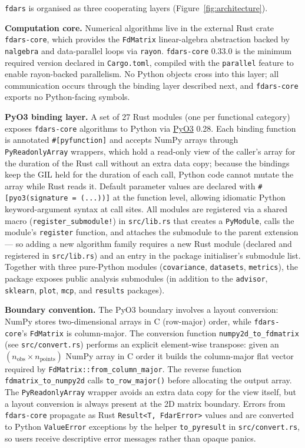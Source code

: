 \texttt{fdars} is organised as three cooperating layers
(Figure~\ref{fig:architecture}).

\textbf{Computation core.}  Numerical algorithms live in the external Rust
crate \texttt{fdars-core}, which provides the \texttt{FdMatrix} linear-algebra
abstraction backed by \texttt{nalgebra} and data-parallel loops via
\texttt{rayon}.  \texttt{fdars-core} 0.33.0 is the minimum required version
declared in \texttt{Cargo.toml}, compiled with the \texttt{parallel} feature
to enable rayon-backed parallelism.  No Python objects cross into this layer;
all communication occurs through the binding layer described next, and
\texttt{fdars-core} exports no Python-facing symbols.

\textbf{PyO3 binding layer.}  A set of 27 Rust modules (one per
functional category) exposes \texttt{fdars-core} algorithms to Python via
\href{https://pyo3.rs}{PyO3} 0.28.  Each binding function is annotated
\texttt{\#[pyfunction]} and accepts NumPy arrays through
\texttt{PyReadonlyArray} wrappers, which hold a read-only view of the
caller's array for the duration of the Rust call without an extra data copy;
because the bindings keep the GIL held for the duration of each call, Python
code cannot mutate the array while Rust reads it.
Default parameter values are declared with \texttt{\#[pyo3(signature = (...))]}
at the function level, allowing idiomatic Python keyword-argument syntax at
call sites.  All modules are registered via a shared macro
(\texttt{register\_submodule!}) in \texttt{src/lib.rs} that creates a
\texttt{PyModule}, calls the module's \texttt{register} function, and attaches
the submodule to the parent extension --- so adding a new algorithm family
requires a new Rust module (declared and registered in \texttt{src/lib.rs})
and an entry in the package initialiser's submodule list.  Together with three
pure-Python modules (\texttt{covariance}, \texttt{datasets},
\texttt{metrics}), the package exposes \nsubmodules{} public analysis
submodules (in addition to the \texttt{advisor}, \texttt{sklearn},
\texttt{plot}, \texttt{mcp}, and \texttt{results} packages).

\textbf{Boundary convention.}  The PyO3 boundary involves a layout conversion:
NumPy stores two-dimensional arrays in C (row-major) order, while
\texttt{fdars-core}'s \texttt{FdMatrix} is column-major.  The conversion
function \texttt{numpy2d\_to\_fdmatrix} (see \texttt{src/convert.rs}) performs
an explicit element-wise transpose: given an $(n_\mathrm{obs} \times
n_\mathrm{points})$ NumPy array in C order it builds the column-major flat
vector required by \texttt{FdMatrix::from\_column\_major}.  The reverse
function \texttt{fdmatrix\_to\_numpy2d} calls \texttt{to\_row\_major()} before
allocating the output array.  The \texttt{PyReadonlyArray} wrapper avoids an
extra data copy for the view itself, but a layout conversion is always present
at the 2D matrix boundary.  Errors from \texttt{fdars-core} propagate as Rust
\texttt{Result<T, FdarError>} values and are converted to Python
\texttt{ValueError} exceptions by the helper \texttt{to\_pyresult} in
\texttt{src/convert.rs}, so users receive descriptive error messages rather
than opaque panics.

